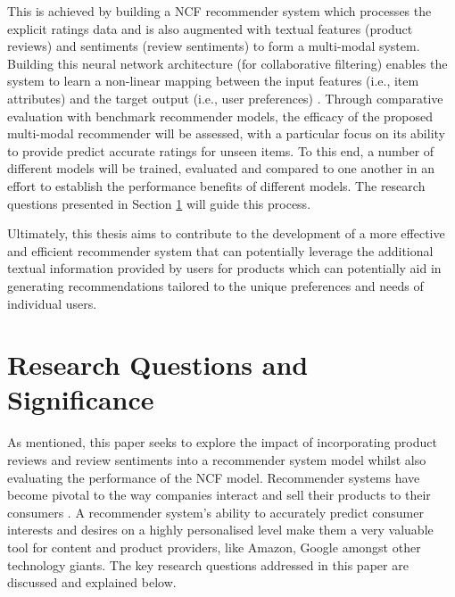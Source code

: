 This is achieved by building a NCF recommender system which processes the explicit ratings data and is also augmented with textual features (product reviews) and sentiments (review sentiments) to form a multi-modal system. Building this neural network architecture (for collaborative filtering) enables the system to learn a non-linear mapping between the input features (i.e., item attributes) and the target output (i.e., user preferences) \cite{he2017neural}. Through comparative evaluation with benchmark recommender models, the efficacy of the proposed multi-modal recommender will be assessed, with a particular focus on its ability to provide predict accurate ratings for unseen items. To this end, a number of different models will be trained, evaluated and compared to one another in an effort to establish the performance benefits of different models. The research questions presented in Section \ref{sec:1 Research Questions and Significance} will guide this process.

Ultimately, this thesis aims to contribute to the development of a more effective and efficient recommender system that can potentially leverage the additional textual information provided by users for products which can potentially aid in generating recommendations tailored to the unique preferences and needs of individual users.

\section{Research Questions and Significance}
\label{sec:1 Research Questions and Significance}

As mentioned, this paper seeks to explore the impact of incorporating product reviews and review sentiments into a recommender system model whilst also evaluating the performance of the NCF model. Recommender systems have become pivotal to the way companies interact and sell their products to their consumers \cite{steck2021deep}. A recommender system’s ability to accurately predict consumer interests and desires on a highly personalised level make them a very valuable tool for content and product providers, like Amazon, Google amongst other technology giants. The key research questions addressed in this paper are discussed and explained below. 





